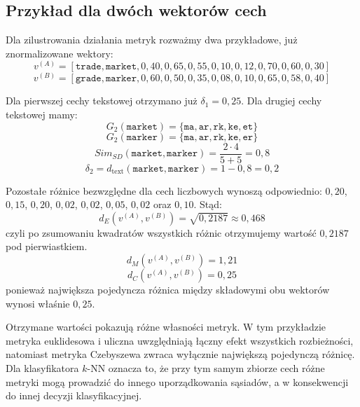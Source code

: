 \documentclass{article}
\begin{document}
\subsection{Przykład dla dwóch wektorów cech}
Dla zilustrowania działania metryk rozważmy dwa przykładowe, już znormalizowane wektory:
\begin{equation}
    v^{(A)} = [\texttt{trade}, \texttt{market}, 0{,}40, 0{,}65, 0{,}55, 0{,}10, 0{,}12, 0{,}70, 0{,}60, 0{,}30]
\end{equation}
\begin{equation}
    v^{(B)} = [\texttt{grade}, \texttt{marker}, 0{,}60, 0{,}50, 0{,}35, 0{,}08, 0{,}10, 0{,}65, 0{,}58, 0{,}40]
\end{equation}

Dla pierwszej cechy tekstowej otrzymano już $\delta_1 = 0{,}25$. Dla drugiej cechy tekstowej
mamy:
\begin{equation}
    G_2(\texttt{market}) = \{\texttt{ma}, \texttt{ar}, \texttt{rk}, \texttt{ke}, \texttt{et}\}
\end{equation}
\begin{equation}
    G_2(\texttt{marker}) = \{\texttt{ma}, \texttt{ar}, \texttt{rk}, \texttt{ke}, \texttt{er}\}
\end{equation}
\begin{equation}
    Sim_{SD}(\texttt{market}, \texttt{marker}) = \frac{2 \cdot 4}{5 + 5} = 0{,}8
\end{equation}
\begin{equation}
    \delta_2 = d_{\text{text}}(\texttt{market}, \texttt{marker}) = 1 - 0{,}8 = 0{,}2
\end{equation}

Pozostałe różnice bezwzględne dla cech liczbowych wynoszą odpowiednio:
$0{,}20$, $0{,}15$, $0{,}20$, $0{,}02$, $0{,}02$, $0{,}05$, $0{,}02$ oraz $0{,}10$. Stąd:
\begin{equation}
    d_E(v^{(A)}, v^{(B)}) = \sqrt{0{,}2187} \approx 0{,}468
\end{equation}
czyli po zsumowaniu kwadratów wszystkich różnic otrzymujemy wartość $0{,}2187$ pod
pierwiastkiem.
\begin{equation}
    d_M(v^{(A)}, v^{(B)}) = 1{,}21
\end{equation}
\begin{equation}
    d_C(v^{(A)}, v^{(B)}) = 0{,}25
\end{equation}
ponieważ największa pojedyncza różnica między składowymi obu wektorów wynosi właśnie
$0{,}25$.

Otrzymane wartości pokazują różne własności metryk. W tym przykładzie metryka euklidesowa i
uliczna uwzględniają łączny efekt wszystkich rozbieżności, natomiast metryka Czebyszewa
zwraca wyłącznie największą pojedynczą różnicę. Dla klasyfikatora $k$-NN oznacza to, że przy
tym samym zbiorze cech różne metryki mogą prowadzić do innego uporządkowania sąsiadów, a w
konsekwencji do innej decyzji klasyfikacyjnej.
\end{document}
